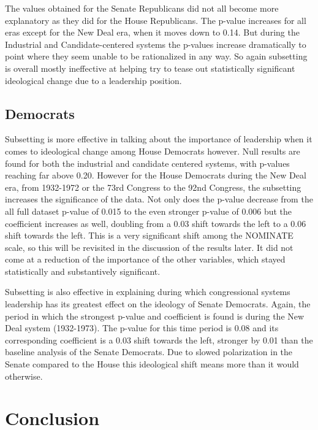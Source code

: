 \documentclass[12pt,twoside]{reedthesis}
\begin{document}
  The values obtained for the Senate Republicans did not all become more
  explanatory as they did for the House Republicans. The p-value increases
  for all eras except for the New Deal era, when it moves down to 0.14.
  But during the Industrial and Candidate-centered systems the p-values
  increase dramatically to point where they seem unable to be rationalized
  in any way. So again subsetting is overall mostly ineffective at helping
  try to tease out statistically significant ideological change due to a
  leadership position.
  
  \subsection{Democrats}\label{democrats-1}
  
  Subsetting is more effective in talking about the importance of
  leadership when it comes to ideological change among House Democrats
  however. Null results are found for both the industrial and candidate
  centered systems, with p-values reaching far above 0.20. However for the
  House Democrats during the New Deal era, from 1932-1972 or the 73rd
  Congress to the 92nd Congress, the subsetting increases the significance
  of the data. Not only does the p-value decrease from the all full
  dataset p-value of 0.015 to the even stronger p-value of 0.006 but the
  coefficient increases as well, doubling from a 0.03 shift towards the
  left to a 0.06 shift towards the left. This is a very significant shift
  among the NOMINATE scale, so this will be revisited in the discussion of
  the results later. It did not come at a reduction of the importance of
  the other variables, which stayed statistically and substantively
  significant.
  
  Subsetting is also effective in explaining during which congressional
  systems leadership has its greatest effect on the ideology of Senate
  Democrats. Again, the period in which the strongest p-value and
  coefficient is found is during the New Deal system (1932-1973). The
  p-value for this time period is 0.08 and its corresponding coefficient
  is a 0.03 shift towards the left, stronger by 0.01 than the baseline
  analysis of the Senate Democrats. Due to slowed polarization in the
  Senate compared to the House this ideological shift means more than it
  would otherwise.
  
  \section{Conclusion}\label{conclusion}
  
\end{document}
